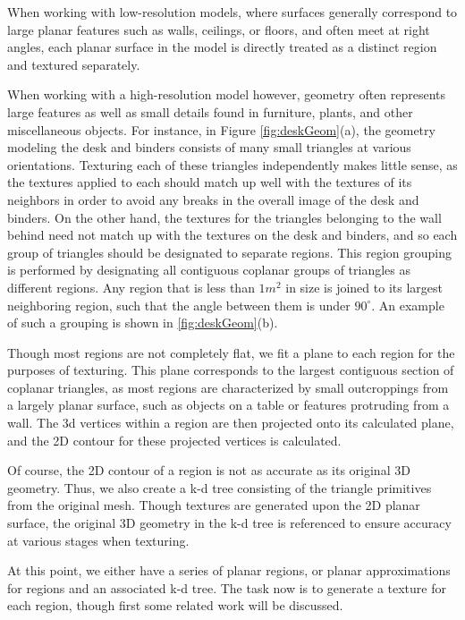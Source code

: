 \documentclass[]{spie}  %
\begin{document}
When working with low-resolution models, where surfaces generally
correspond to large planar features such as walls, ceilings, or
floors, and often meet at right angles, each planar surface in the
model is directly treated as a distinct region and textured
separately.

When working with a high-resolution model however, geometry often
represents large features as well as small details found in furniture,
plants, and other miscellaneous objects. For instance, in Figure
\ref{fig:deskGeom}(a), the geometry modeling the desk and binders
consists of many small triangles at various orientations. Texturing
each of these triangles independently makes little sense, as the
textures applied to each should match up well with the textures of its
neighbors in order to avoid any breaks in the overall image of the
desk and binders. On the other hand, the textures for the triangles
belonging to the wall behind need not match up with the textures on
the desk and binders, and so each group of triangles should be
designated to separate regions. This region grouping is performed by
designating all contiguous coplanar groups of triangles as different
regions. Any region that is less than $1 m^2$ in size is joined to its
largest neighboring region, such that the angle between them is under
$90^{\circ}$. An example of such a grouping is shown in
\ref{fig:deskGeom}(b).

Though most regions are not completely flat, we fit a plane to each
region for the purposes of texturing. This plane corresponds to the
largest contiguous section of coplanar triangles, as most regions are
characterized by small outcroppings from a largely planar surface,
such as objects on a table or features protruding from a wall. The 3d
vertices within a region are then projected onto its calculated plane,
and the 2D contour for these projected vertices is calculated.

Of course, the 2D contour of a region is not as accurate as its
original 3D geometry. Thus, we also create a k-d tree consisting of
the triangle primitives from the original mesh. Though textures are
generated upon the 2D planar surface, the original 3D geometry in the
k-d tree is referenced to ensure accuracy at various stages when
texturing.

At this point, we either have a series of planar regions, or planar
approximations for regions and an associated k-d tree. The task now is
to generate a texture for each region, though first some related work
will be discussed.
\end{document}
